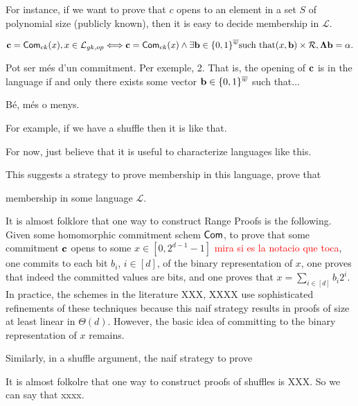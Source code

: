 For instance, if we want to prove that $c$ opens to an element in a set $S$ of polynomial size (publicly known), then it is easy to decide membership in $\mathcal{L}$. 

 
 $$ \mathbf{c}=\mathsf{Com}_{ck}(x), x \in \mathcal{L}_{gk,op} \Longleftrightarrow   \mathbf{c}=\mathsf{Com}_{ck}(x) \wedge \exists \mathbf{b} \in \{0,1\}^{\overline{w}} \text{such that} (x,\mathbf{b}) \times \mathcal{R}, \mathbf{{\Lambda}}\mathbf{b}=\mathbf{\alpha}.$$  

Pot ser més d'un commitment. Per exemple, 2. 
That is, the opening of $\mathbf{c}$ is in the language if and only there exists some vector $\mathbf{b} \in \{0,1\}^{\overline{w}}$ such that... 

  Bé, més o menys. 
  
 For example, if we have a shuffle then it is like that. 
 
 For now, just believe that it is useful to characterize languages like this. 

This suggests a strategy to prove membership in this language, prove that  

          


 
   




membership in some language $\mathcal{L}$.  











It is almost folklore that one way to construct Range Proofs is the following. Given some homomorphic commitment schem $\mathsf{Com}$, 
to prove that some commitment $\mathbf{c}$ opens to some $x \in [0,2^{d-1}-1]$ \textcolor{red}{mira si es la notacio que toca}, one commits to  each bit $b_i$, $i \in [d]$, of the binary representation of $x$, one proves that indeed the committed values are bits, and one proves that 
$x=\sum_{i \in [d]} b_i 2^i$. In practice, the schemes in the literature XXX, XXXX use sophisticated refinements of these techniques because this naif strategy results in proofs of size at least linear in $\Theta(d)$.  However, the basic idea of committing to the binary representation  of $x$ remains.  

Similarly, in a shuffle argument, the naif strategy to prove 
  

It is almost folkolre that one way to construct proofs of shuffles is XXX. So we can say that xxxx. 

